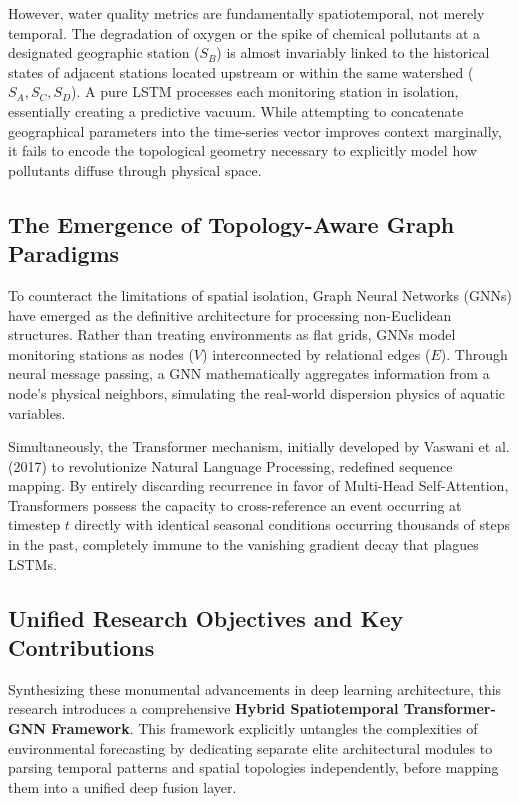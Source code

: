 \documentclass[journal,10pt,twocolumn]{IEEEtran}
\begin{document}
However, water quality metrics are fundamentally spatiotemporal, not merely temporal. The degradation of oxygen or the spike of chemical pollutants at a designated geographic station ($S_B$) is almost invariably linked to the historical states of adjacent stations located upstream or within the same watershed ($S_A, S_C, S_D$). A pure LSTM processes each monitoring station in isolation, essentially creating a predictive vacuum. While attempting to concatenate geographical parameters into the time-series vector improves context marginally, it fails to encode the topological geometry necessary to explicitly model how pollutants diffuse through physical space.

\subsection{The Emergence of Topology-Aware Graph Paradigms}
To counteract the limitations of spatial isolation, Graph Neural Networks (GNNs) have emerged as the definitive architecture for processing non-Euclidean structures. Rather than treating environments as flat grids, GNNs model monitoring stations as nodes ($V$) interconnected by relational edges ($E$). Through neural message passing, a GNN mathematically aggregates information from a node's physical neighbors, simulating the real-world dispersion physics of aquatic variables.

Simultaneously, the Transformer mechanism, initially developed by Vaswani et al. (2017) to revolutionize Natural Language Processing, redefined sequence mapping. By entirely discarding recurrence in favor of Multi-Head Self-Attention, Transformers possess the capacity to cross-reference an event occurring at timestep $t$ directly with identical seasonal conditions occurring thousands of steps in the past, completely immune to the vanishing gradient decay that plagues LSTMs.

\subsection{Unified Research Objectives and Key Contributions}
Synthesizing these monumental advancements in deep learning architecture, this research introduces a comprehensive \textbf{Hybrid Spatiotemporal Transformer-GNN Framework}. This framework explicitly untangles the complexities of environmental forecasting by dedicating separate elite architectural modules to parsing temporal patterns and spatial topologies independently, before mapping them into a unified deep fusion layer.
\end{document}
